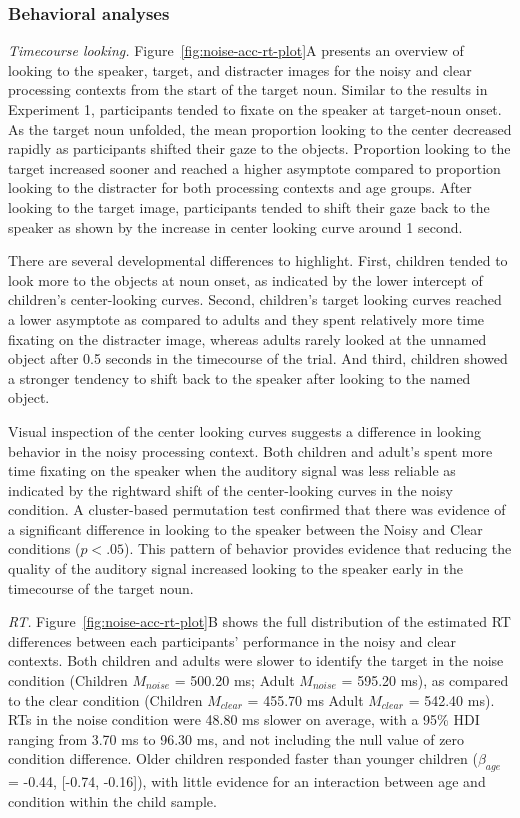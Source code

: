 \documentclass[,man,floatsintext]{apa6}
\begin{document}
\subsubsection{Behavioral analyses}\label{behavioral-analyses-1}

\emph{Timecourse looking.} Figure~\ref{fig:noise-acc-rt-plot}A presents
an overview of looking to the speaker, target, and distracter images for
the noisy and clear processing contexts from the start of the target
noun. Similar to the results in Experiment 1, participants tended to
fixate on the speaker at target-noun onset. As the target noun unfolded,
the mean proportion looking to the center decreased rapidly as
participants shifted their gaze to the objects. Proportion looking to
the target increased sooner and reached a higher asymptote compared to
proportion looking to the distracter for both processing contexts and
age groups. After looking to the target image, participants tended to
shift their gaze back to the speaker as shown by the increase in center
looking curve around 1 second.

There are several developmental differences to highlight. First,
children tended to look more to the objects at noun onset, as indicated
by the lower intercept of children's center-looking curves. Second,
children's target looking curves reached a lower asymptote as compared
to adults and they spent relatively more time fixating on the distracter
image, whereas adults rarely looked at the unnamed object after 0.5
seconds in the timecourse of the trial. And third, children showed a
stronger tendency to shift back to the speaker after looking to the
named object.

Visual inspection of the center looking curves suggests a difference in
looking behavior in the noisy processing context. Both children and
adult's spent more time fixating on the speaker when the auditory signal
was less reliable as indicated by the rightward shift of the
center-looking curves in the noisy condition. A cluster-based
permutation test confirmed that there was evidence of a significant
difference in looking to the speaker between the Noisy and Clear
conditions (\(p < .05\)). This pattern of behavior provides evidence
that reducing the quality of the auditory signal increased looking to
the speaker early in the timecourse of the target noun.

\emph{RT.} Figure~\ref{fig:noise-acc-rt-plot}B shows the full
distribution of the estimated RT differences between each participants'
performance in the noisy and clear contexts. Both children and adults
were slower to identify the target in the noise condition (Children
\(M_{noise}\) = 500.20 ms; Adult \(M_{noise}\) = 595.20 ms), as compared
to the clear condition (Children \(M_{clear}\) = 455.70 ms Adult
\(M_{clear}\) = 542.40 ms). RTs in the noise condition were 48.80 ms
slower on average, with a 95\% HDI ranging from 3.70 ms to 96.30 ms, and
not including the null value of zero condition difference. Older
children responded faster than younger children (\(\beta_{age}\) =
-0.44, {[}-0.74, -0.16{]}), with little evidence for an interaction
between age and condition within the child sample.
\end{document}

